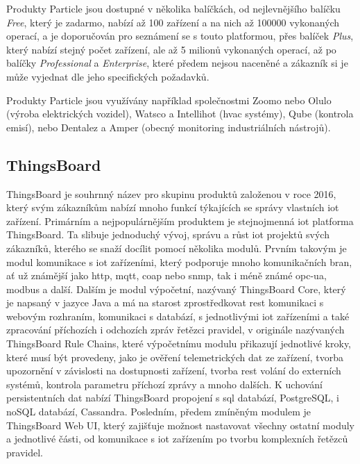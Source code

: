 Produkty Particle jsou dostupné v několika balíčkách, od nejlevnějšího balíčku \emph{Free}, který je zadarmo, nabízí až 100 zařízení a na nich až 100000 vykonaných operací, a je doporučován pro seznámení se s touto platformou, přes balíček \emph{Plus}, který nabízí stejný počet zařízení, ale až 5 milionů vykonaných operací, až po balíčky \emph{Professional} a \emph{Enterprise}, které předem nejsou naceněné a zákazník si je může vyjednat dle jeho specifických požadavků.  

Produkty Particle jsou využívány například společnostmi Zoomo nebo Olulo (výroba elektrických vozidel), Watsco a Intellihot (\acrshort{hvac} systémy), Qube (kontrola emisí), nebo Dentalez a Amper (obecný monitoring industriálních nástrojů).

\subsection{ThingsBoard}

ThingsBoard je souhrnný název pro skupinu produktů založenou v roce 2016, který svým zákazníkům nabízí mnoho funkcí týkajících se správy vlastních \acrshort{iot} zařízení. Primárním a nejpopulárnějším produktem je stejnojmenná \acrshort{iot} platforma ThingsBoard. Ta slibuje jednoduchý vývoj, správu a růst \acrshort{iot} projektů svých zákazníků, kterého se snaží docílit pomocí několika modulů. Prvním takovým je modul komunikace s \acrshort{iot} zařízeními, který podporuje mnoho komunikačních bran, ať už známější jako \acrshort{http}, \acrshort{mqtt}, \acrshort{coap} nebo \acrshort{snmp}, tak i méně známé \acrshort{opc-ua}, modbus a další. Dalším je modul výpočetní, nazývaný ThingsBoard Core, který je napsaný v jazyce Java a má na starost zprostředkovat \acrshort{rest} komunikaci s webovým rozhraním, komunikaci s databází, s jednotlivými \acrshort{iot} zařízeními a také zpracování příchozích i odchozích zpráv řetězci pravidel, v originále nazývaných ThingsBoard Rule Chains, které výpočetnímu modulu přikazují jednotlivé kroky, které musí být provedeny, jako je ověření telemetrických dat ze zařízení, tvorba upozornění v závislosti na dostupnosti zařízení, tvorba \acrshort{rest} volání do externích systémů, kontrola parametru příchozí zprávy a mnoho dalších. K uchování persistentních dat nabízí ThingsBoard propojení s \acrshort{sql} databází, PostgreSQL, i noSQL databází, Cassandra. Posledním, předem zmíněným modulem je ThingsBoard Web UI, který zajišťuje možnost nastavovat všechny ostatní moduly a jednotlivé části, od komunikace s \acrshort{iot} zařízením po tvorbu komplexních řetězců pravidel.

